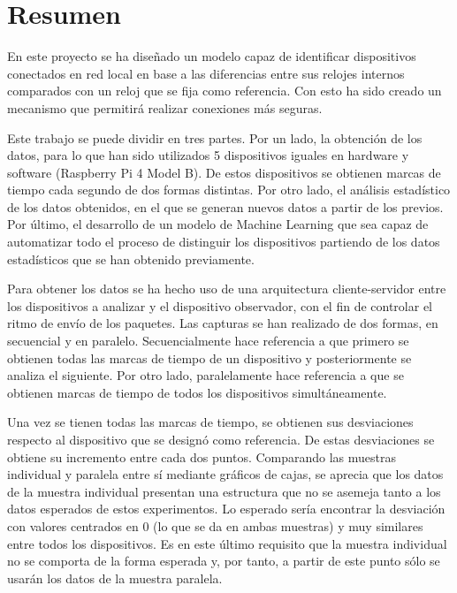 
\chapter*{Resumen}
 \label{chap:resumen}

En este proyecto se ha diseñado un modelo capaz de identificar dispositivos conectados en red local en base a las diferencias entre sus relojes internos comparados con un reloj que se fija como referencia. Con esto ha sido creado un mecanismo que permitirá realizar conexiones más seguras.

Este trabajo se puede dividir en tres partes. Por un lado, la obtención de los datos, para lo que han sido utilizados 5 dispositivos iguales en hardware y software (Raspberry Pi 4 Model B). De estos dispositivos se obtienen marcas de tiempo cada segundo de dos formas distintas. Por otro lado, el análisis estadístico de los datos obtenidos, en el que se generan nuevos datos a partir de los previos. Por último, el desarrollo de un modelo de Machine Learning que sea capaz de automatizar todo el proceso de distinguir los dispositivos partiendo de los datos estadísticos que se han obtenido previamente.

Para obtener los datos se ha hecho uso de una arquitectura cliente-servidor entre los dispositivos a analizar y el dispositivo observador, con el fin de controlar el ritmo de envío de los paquetes. Las capturas se han realizado de dos formas, en secuencial y en paralelo. Secuencialmente hace referencia a que primero se obtienen todas las marcas de tiempo de un dispositivo y posteriormente se analiza el siguiente. Por otro lado, paralelamente hace referencia a que se obtienen marcas de tiempo de todos los dispositivos simultáneamente.

Una vez se tienen todas las marcas de tiempo, se obtienen sus desviaciones respecto al dispositivo que se designó como referencia. De estas desviaciones se obtiene su incremento entre cada dos puntos. Comparando las muestras individual y paralela entre sí mediante gráficos de cajas, se aprecia que los datos de la muestra individual presentan una estructura que no se asemeja tanto a los datos esperados de estos experimentos. Lo esperado sería encontrar la desviación con valores centrados en 0 (lo que se da en ambas muestras) y muy similares entre todos los dispositivos. Es en este último requisito que la muestra individual no se comporta de la forma esperada y, por tanto, a partir de este punto sólo se usarán los datos de la muestra paralela.


